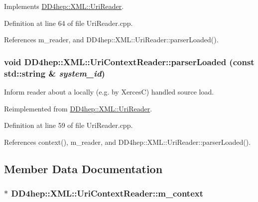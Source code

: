 Implements \hyperlink{class_d_d4hep_1_1_x_m_l_1_1_uri_reader_ad04589fb5da7fe238c1a0cf1c8e4f0ac}{DD4hep::XML::UriReader}.

Definition at line 64 of file UriReader.cpp.

References m\_\-reader, and DD4hep::XML::UriReader::parserLoaded().\hypertarget{class_d_d4hep_1_1_x_m_l_1_1_uri_context_reader_ae3ec9a7f4f18adf4dcac1d894453dbd0}{
\subsubsection[{parserLoaded}]{\setlength{\rightskip}{0pt plus 5cm}void DD4hep::XML::UriContextReader::parserLoaded (const std::string \& {\em system\_\-id})}}
\label{class_d_d4hep_1_1_x_m_l_1_1_uri_context_reader_ae3ec9a7f4f18adf4dcac1d894453dbd0}


Inform reader about a locally (e.g. by XercesC) handled source load. 

Reimplemented from \hyperlink{class_d_d4hep_1_1_x_m_l_1_1_uri_reader_a58d5ece4bc5ee3b5d1d8f9eac85baecd}{DD4hep::XML::UriReader}.

Definition at line 59 of file UriReader.cpp.

References context(), m\_\-reader, and DD4hep::XML::UriReader::parserLoaded().

\subsection{Member Data Documentation}
\hypertarget{class_d_d4hep_1_1_x_m_l_1_1_uri_context_reader_ac95a39733d67430a8faa6427f750e448}{
\subsubsection[{m\_\-context}]{$\ast$ {\bf DD4hep::XML::UriContextReader::m\_\-context}}}
\label{class_d_d4hep_1_1_x_m_l_1_1_uri_context_reader_ac95a39733d67430a8faa6427f750e448}


